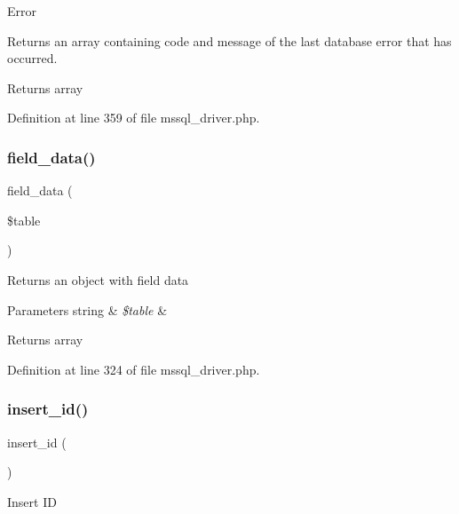 Error

Returns an array containing code and message of the last database error that has occurred.

\begin{DoxyReturn}{Returns}
array 
\end{DoxyReturn}


Definition at line 359 of file mssql\+\_\+driver.\+php.

\mbox{\label{class_c_i___d_b__mssql__driver_a90355121e1ed009e0efdbd544ab56efa}} 
\subsubsection{\texorpdfstring{field\_data()}{field\_data()}}
{\footnotesize\ttfamily field\+\_\+data (\begin{DoxyParamCaption}\item[{}]{\$table }\end{DoxyParamCaption})}

Returns an object with field data


\begin{DoxyParams}[1]{Parameters}
string & {\em \$table} & \\
\hline
\end{DoxyParams}
\begin{DoxyReturn}{Returns}
array 
\end{DoxyReturn}


Definition at line 324 of file mssql\+\_\+driver.\+php.

\mbox{\label{class_c_i___d_b__mssql__driver_a933f2cde8dc7f87875e257d0a4902e99}} 
\subsubsection{\texorpdfstring{insert\_id()}{insert\_id()}}
{\footnotesize\ttfamily insert\+\_\+id (\begin{DoxyParamCaption}{ }\end{DoxyParamCaption})}

Insert ID

